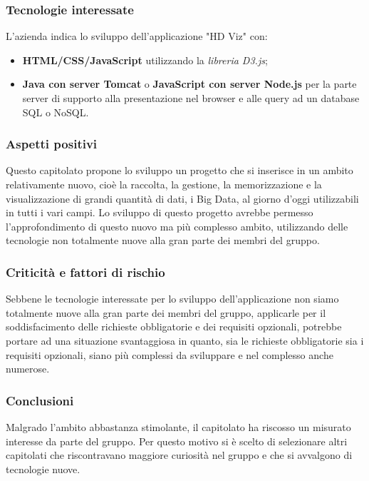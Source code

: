 \subsubsection{Tecnologie interessate}
L'azienda indica lo sviluppo dell'applicazione "HD Viz" con:
\begin{itemize}
\item \textbf{HTML/CSS/JavaScript} utilizzando la \textit{libreria D3.js};
\item \textbf{Java con server Tomcat} o \textbf{JavaScript con server Node.js} per la parte server di supporto alla presentazione nel browser e alle query ad un database SQL o NoSQL.
\end{itemize}
\subsubsection{Aspetti positivi}
Questo capitolato propone lo sviluppo un progetto che si inserisce in un ambito relativamente nuovo, cioè la raccolta, la gestione, la memorizzazione e la visualizzazione di grandi quantità di dati, i Big Data, al giorno d'oggi utilizzabili in tutti i vari campi.
Lo sviluppo di questo progetto avrebbe permesso l'approfondimento di questo nuovo ma più complesso ambito, utilizzando delle tecnologie non totalmente nuove alla gran parte dei membri del gruppo.
\subsubsection{Criticità e fattori di rischio}
Sebbene le tecnologie interessate per lo sviluppo dell'applicazione non siamo totalmente nuove alla gran parte dei membri del gruppo, applicarle per il soddisfacimento delle richieste obbligatorie e dei requisiti opzionali, potrebbe portare ad una situazione svantaggiosa in quanto, sia le richieste obbligatorie sia i requisiti opzionali, siano più complessi da sviluppare e nel complesso anche numerose.
\subsubsection{Conclusioni}
Malgrado l'ambito abbastanza stimolante, il capitolato ha riscosso un misurato interesse da parte del gruppo.
Per questo motivo si è scelto di selezionare altri capitolati che riscontravano maggiore curiosità nel gruppo e che si avvalgono di tecnologie nuove.